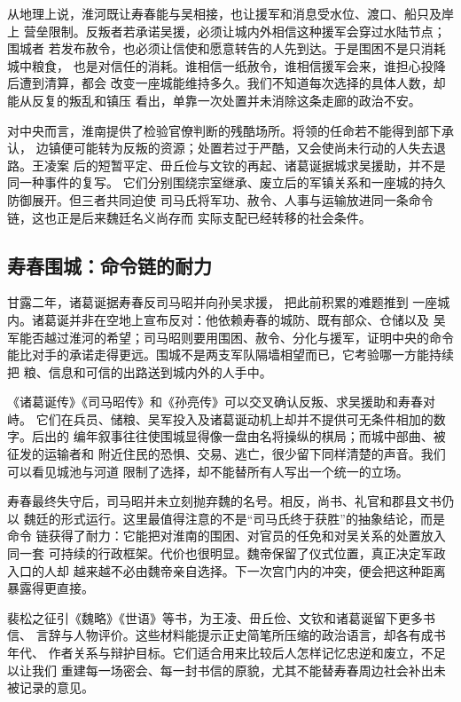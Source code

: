 从地理上说，淮河既让寿春能与吴相接，也让援军和消息受水位、渡口、船只及岸上
营垒限制。反叛者若承诺吴援，必须让城内外相信这种援军会穿过水陆节点；围城者
若发布赦令，也必须让信使和愿意转告的人先到达。于是围困不是只消耗城中粮食，
也是对信任的消耗。谁相信一纸赦令，谁相信援军会来，谁担心投降后遭到清算，都会
改变一座城能维持多久。我们不知道每次选择的具体人数，却能从反复的叛乱和镇压
看出，单靠一次处置并未消除这条走廊的政治不安。

对中央而言，淮南提供了检验官僚判断的残酷场所。将领的任命若不能得到部下承认，
边镇便可能转为反叛的资源；处置若过于严酷，又会使尚未行动的人失去退路。王凌案
后的短暂平定、毌丘俭与文钦的再起、诸葛诞据城求吴援助，并不是同一种事件的复写。
它们分别围绕宗室继承、废立后的军镇关系和一座城的持久防御展开。但三者共同迫使
司马氏将军功、赦令、人事与运输放进同一条命令链，这也正是后来魏廷名义尚存而
实际支配已经转移的社会条件。
\subsection{寿春围城：命令链的耐力}

甘露二年，诸葛诞据寿春反司马昭并向孙吴求援，
把此前积累的难题推到
一座城内。诸葛诞并非在空地上宣布反对：他依赖寿春的城防、既有部众、仓储以及
吴军能否越过淮河的希望；司马昭则要用围困、赦令、分化与援军，证明中央的命令
能比对手的承诺走得更远。围城不是两支军队隔墙相望而已，它考验哪一方能持续把
粮、信息和可信的出路送到城内外的人手中。

《诸葛诞传》《司马昭传》和《孙亮传》可以交叉确认反叛、求吴援助和寿春对峙。
它们在兵员、储粮、吴军投入及诸葛诞动机上却并不提供可无条件相加的数字。后出的
编年叙事往往使围城显得像一盘由名将操纵的棋局；而城中部曲、被征发的运输者和
附近住民的恐惧、交易、逃亡，很少留下同样清楚的声音。我们可以看见城池与河道
限制了选择，却不能替所有人写出一个统一的立场。

寿春最终失守后，司马昭并未立刻抛弃魏的名号。相反，尚书、礼官和郡县文书仍以
魏廷的形式运行。这里最值得注意的不是“司马氏终于获胜”的抽象结论，而是命令
链获得了耐力：它能把对淮南的围困、对官员的任免和对吴关系的处置放入同一套
可持续的行政框架。代价也很明显。魏帝保留了仪式位置，真正决定军政入口的人却
越来越不必由魏帝亲自选择。下一次宫门内的冲突，便会把这种距离暴露得更直接。

\begin{debate}[裴松之的长注能否补齐淮南的现场？]
裴松之征引《魏略》《世语》等书，为王凌、毌丘俭、文钦和诸葛诞留下更多书信、
言辞与人物评价。这些材料能提示正史简笔所压缩的政治语言，却各有成书年代、
作者关系与辩护目标。它们适合用来比较后人怎样记忆忠逆和废立，不足以让我们
重建每一场密会、每一封书信的原貌，尤其不能替寿春周边社会补出未被记录的意见。
\end{debate}

